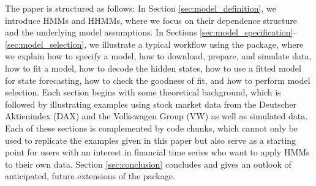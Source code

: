 \documentclass[article,shortnames]{jss}
\begin{document}
The paper is structured as follows: In Section \ref{sec:model_definition}, we introduce HMMs and HHMMs, where we focus on their dependence structure and the underlying model assumptions. In Sections \ref{sec:model_specification}--\ref{sec:model_selection}, we illustrate a typical workflow using the  package, where we explain how to specify a model, how to download, prepare, and simulate data, how to fit a model, how to decode the hidden states, how to use a fitted model for state forecasting, how to check the goodness of fit, and how to perform model selection. Each section begins with some theoretical background, which is followed by illustrating examples using stock market data from the Deutscher Aktienindex (DAX) and the Volkswagen Group (VW) as well as simulated data. Each of these sections is complemented by code chunks, which cannot only be used to replicate the examples given in this paper but also serve as a starting point for  users with an interest in financial time series who want to apply HMMs to their own data. Section \ref{sec:conclusion} concludes and gives an outlook of anticipated, future extensions of the  package.


\end{document}
